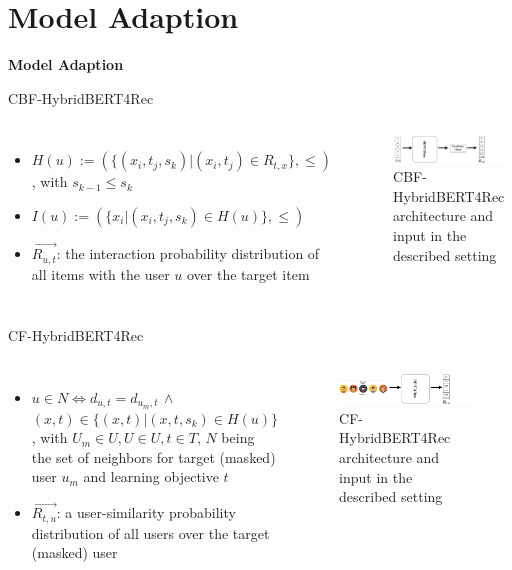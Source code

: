 \documentclass[en]{sdqbeamer}
\begin{document}
\section{Model Adaption}
\begin{frame}
	\centering\textbf{\LARGE{Model Adaption}}
\end{frame}

\begin{frame}{CBF-HybridBERT4Rec}
	\begin{columns}
			\begin{itemize}
				\item $H(u) := (\{(x_i, t_j, s_k)| (x_i, t_j) \in R_{t,x}\}, \leq)$, with $s_{k-1} \leq s_k$
				\item $I(u) := (\{x_i|(x_i, t_j, s_k) \in H(u)\}, \leq)$
				\item $\overrightarrow{R_{u,t}}$: the interaction probability distribution of all items with the user $u$ over the target item
			\end{itemize}
		\begin{figure}
			\includegraphics[width=\textwidth]{images/cbf.pdf}
			\caption{CBF-HybridBERT4Rec architecture and input in the described setting}
		\end{figure}
	\end{columns}
\end{frame}

\begin{frame}{CF-HybridBERT4Rec}
	\begin{columns}
		\column{0.5\textwidth}
			\begin{itemize}
				\item $u \in N \iff d_{u, t} = d_{u_m, t} \, \wedge$ $(x, t) \in \{(x,t)|(x,t,s_k) \in H(u)\}$, with $U_m \in U, U \in U, t \in T$, $N$ being the set of neighbors for target (masked) user $u_{m}$ and learning objective $t$
				\item $\overrightarrow{R_{t,u}}$: a user-similarity probability distribution of all users over the target (masked) user
			\end{itemize}
		\column{0.5\textwidth}
		\begin{figure}
			\includegraphics[width=\textwidth]{images/CF_use_case.pdf}
			\caption{CF-HybridBERT4Rec architecture and input in the described setting}
		\end{figure}
	\end{columns}
\end{frame}
\end{document}
